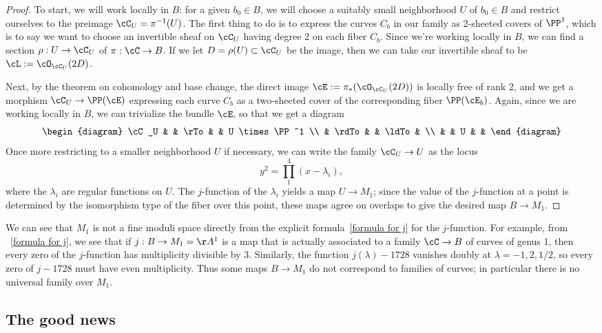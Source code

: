 \begin{proof}
To start, we will work locally in $B$: for a given $b_0 \in B$, we will choose a suitably small neighborhood $U$ of $b_0 \in B$ and restrict ourselves to the preimage $\cC_U = \pi^{-1}(U)$. The first thing to do is to express the curves $C_b$ in our family as 2-sheeted covers of $\PP^1$, which is to say we want to choose an invertible sheaf on $\cC_U$ having degree 2 on each fiber $C_b$. Since we're working locally in $B$,
we can find a section $\rho : U \to \cC_U$ of $\pi : \cC \to B$. If we let $D = \rho(U) \subset \cC_U$ be the image, then we can take our invertible sheaf to be $\cL := \cO_{\cC_U}(2D)$.

Next, by the theorem on cohomology and base change, the direct image $\cE := \pi_*(\cO_{\cC_U}(2D))$ is locally free of rank 2, and we get a morphism $\cC_U \to \PP(\cE)$ expressing each curve $C_b$ as a two-sheeted cover of the corresponding fiber $\PP(\cE_b)$. Again, since we are working locally in $B$, we can trivialize the bundle $\cE$, so that we get a diagram
$$
\begin{diagram}
\cC_U & & \rTo & & U \times \PP^1 \\
& \rdTo & & \ldTo & \\
& & U & &
\end{diagram} 
$$
Once more restricting to a smaller neighborhood $U$ if necessary, we can write the family $\cC_U \to U$ as the locus
$$
y^2 = \prod_1^4 (x - \lambda_i),
$$
where the $\lambda_i$ are regular functions on $U$. The $j$-function of the $\lambda_i$  yields a map $U \to M_1$; since the value of the $j$-function at a point is determined by the isomorphism type of the fiber over this point, these maps agree on overlaps to give  the desired map $B \to M_1$.
\end{proof}


We can see that $M_1$ is not a fine moduli space directly from the explicit formula~\ref{formula for j} for the $j$-function. For example, from ~\ref{formula for j}, we see that if $j : B \to M_1 = \AA^1$ is a map that is actually associated to a family $\cC \to B$ of curves of genus 1, then every zero of the $j$-function has multiplicity divisible by 3.  Similarly, the function $j(\lambda)-1728$ vanishes doubly at $\lambda = -1, 2, 1/2$, so every zero of $j - 1728$ must have even multiplicity. Thus some maps $B\to M_1$ do not correspond to families of curves; in particular there is no universal family over $M_1$. 

\subsection{The good news}

